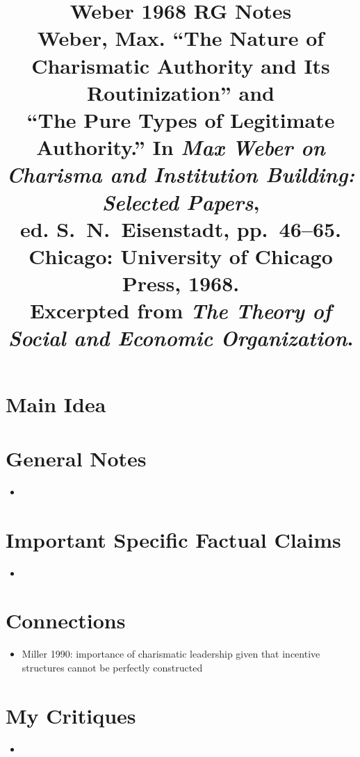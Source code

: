 \documentclass[12pt]{article}
\title{\textbf{Weber 1968 RG Notes}\\
\large Weber, Max. ``The Nature of Charismatic Authority and Its Routinization'' and\\
``The Pure Types of Legitimate Authority.'' In \textit{Max Weber on Charisma and Institution Building: Selected Papers},\\
ed. S.\ N.\ Eisenstadt, pp.\ 46--65. Chicago: University of Chicago Press, 1968.\\
Excerpted from \textit{The Theory of Social and Economic Organization}.}
\author{}
\date{}
\begin{document}
\maketitle

\section{Main Idea}



\section{General Notes}

\begin{itemize}[leftmargin=*, itemsep=4pt]
    \item
\end{itemize}


\section{Important Specific Factual Claims}

\begin{itemize}[leftmargin=*, itemsep=4pt]
    \item
\end{itemize}


\section{Connections}

\begin{itemize}[leftmargin=*, itemsep=4pt]
    \item Miller 1990: importance of charismatic leadership given that incentive structures cannot be perfectly constructed
\end{itemize}


\section{My Critiques}

\begin{itemize}[leftmargin=*, itemsep=4pt]
    \item
\end{itemize}
\end{document}

